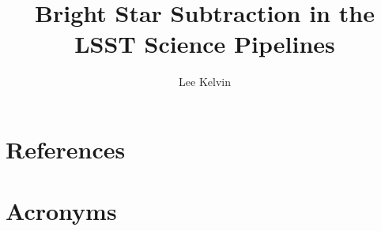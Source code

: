 \documentclass[DM,authoryear,toc]{lsstdoc}
\title{Bright Star Subtraction in the LSST Science Pipelines}
\author{%
Lee Kelvin
}
\date{\vcsDate}
\begin{document}
\maketitle


\appendix
\section{References} \label{sec:bib}
\renewcommand{\refname}{} %


\section{Acronyms} \label{sec:acronyms}

\end{document}
